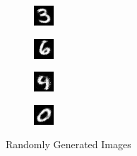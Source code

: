 \documentclass{article}
\begin{document}
	\begin{figure}[h]
		\centering
		\begin{subfigure}[b]{0.2\textwidth}
			\centering
			\includegraphics[scale=2.0]{images/rand_gen1}
		\end{subfigure}
		\begin{subfigure}[b]{0.2\textwidth}
			\centering
			\includegraphics[scale=2.0]{images/rand_gen2}
		\end{subfigure}		
		\begin{subfigure}[b]{0.2\textwidth}
			\centering
			\includegraphics[scale=2.0]{images/rand_gen3}
		\end{subfigure}
		\begin{subfigure}[b]{0.2\textwidth}
			\centering
			\includegraphics[scale=2.0]{images/rand_gen4}
		\end{subfigure}
		
		\caption{Randomly Generated Images}
		\label{fig:random_generated}
	\end{figure} 
	
\end{document}
